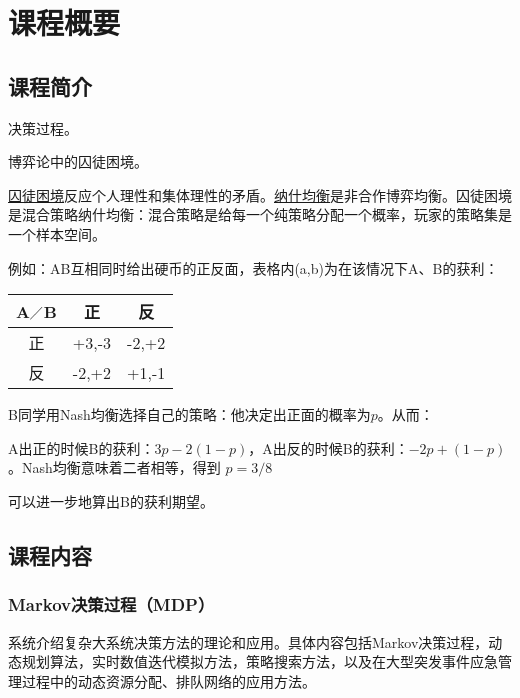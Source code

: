 \chapter{课程概要}

\section{课程简介}

决策过程。

\begin{example}
    博弈论中的囚徒困境。

    \href{https://zh.wikipedia.org/wiki/%E5%9B%9A%E5%BE%92%E5%9B%B0%E5%A2%83}{囚徒困境}反应个人理性和集体理性的矛盾。\href{https://zh.wikipedia.org/wiki/%E7%BA%B3%E4%BB%80%E5%9D%87%E8%A1%A1}{纳什均衡}是非合作博弈均衡。囚徒困境是混合策略纳什均衡：混合策略是给每一个纯策略分配一个概率，玩家的策略集是一个样本空间。

    例如：AB互相同时给出硬币的正反面，表格内(a,b)为在该情况下A、B的获利：
    \begin{table}[htbp]
        \centering
        \begin{tabular}{|c|c|c|}
            \hline
            A$\diagup $B & 正     & 反     \\
            \hline
            正            & +3,-3 & -2,+2 \\
            \hline
            反            & -2,+2 & +1,-1 \\
            \hline
        \end{tabular}
    \end{table}

    B同学用Nash均衡选择自己的策略：他决定出正面的概率为$p$。从而：

    A出正的时候B的获利：$3p - 2(1-p) $，A出反的时候B的获利：$-2p + (1-p) $。Nash均衡意味着二者相等，得到 $p=3/8$

    可以进一步地算出B的获利期望。
\end{example}

\section{课程内容}

\subsection{Markov决策过程（MDP）}

系统介绍复杂大系统决策方法的理论和应用。具体内容包括Markov决策过程，动态规划算法，实时数值迭代模拟方法，策略搜索方法，以及在大型突发事件应急管理过程中的动态资源分配、排队网络的应用方法。

